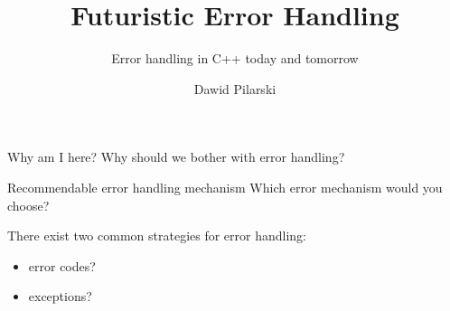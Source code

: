 \documentclass[10pt]{beamer}
\title{Futuristic Error Handling}
\subtitle{Error handling in C++ today and tomorrow}
\date{}
\author{Dawid Pilarski}
\institute{dawid.pilarski@panicsofware.com}
\begin{document}
\maketitle


\begin{frame}{Why am I here?}
	Why should we bother with error handling?
\end{frame}

\begin{frame}{Recommendable error handling mechanism}
	Which error mechanism would you choose?
	
	There exist two common strategies for error handling:
	\begin{itemize}
		\item error codes?
		\item exceptions?
	\end{itemize}
\end{frame}
\end{document}
